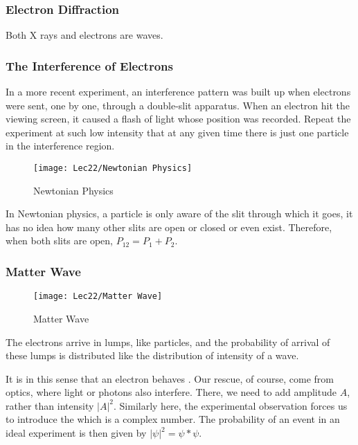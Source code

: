 \subsubsection{Electron Diffraction}
Both X rays and electrons are waves.

\subsubsection{The Interference of Electrons}
In a more recent experiment, an interference pattern was built up when electrons were sent, one by one, through a double-slit apparatus. When an electron hit the viewing screen, it caused a flash of light whose position was recorded. Repeat the experiment at such low intensity that at any given time there is just one particle in the interference region. 

\begin{figure}[H]
    \centering
    \texttt{[image: Lec22/Newtonian Physics]}
    \caption{Newtonian Physics}
\end{figure}

In Newtonian physics, a particle is only aware of the slit through which it goes, it has no idea how many other slits are open or closed or even exist. Therefore, when both slits are open, $P_{12}=P_1+P_2$. 

\subsubsection{Matter Wave}

\begin{figure}[H]
    \centering
    \texttt{[image: Lec22/Matter Wave]}
    \caption{Matter Wave}
\end{figure}


The electrons arrive in lumps, like particles, and the probability of arrival of these lumps is distributed like the distribution of intensity of a wave. 

It is in this sense that an electron behaves . Our rescue, of course, come from optics, where light or photons also interfere. There, we need to add amplitude $A$, rather than intensity $|A|^2$. Similarly here, the experimental observation forces us to introduce the  which is a complex number. The probability of an event in an ideal experiment is then given by $|\psi|^2=\psi * \psi$. 


